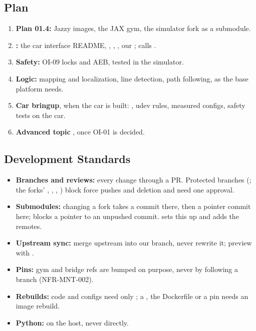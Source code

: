 \documentclass[11pt,a4paper]{article}
\begin{document}
\subsection{Plan}
\begin{enumerate}
  \item \textbf{Plan 01.4:} Jazzy images, the JAX gym, the simulator fork as a submodule.
  \item \textbf{:} the car interface README, , , , our ;  calls .
  \item \textbf{Safety:} OI-09 locks and AEB, tested in the simulator.
  \item \textbf{Logic:} mapping and localization, line detection, path following, as the base platform needs.
  \item \textbf{Car bringup}, when the car is built: , udev rules, measured configs, safety tests on the car.
  \item \textbf{Advanced topic} , once OI-01 is decided.
\end{enumerate}

\subsection{Development Standards}
\begin{itemize}
  \item \textbf{Branches and reviews:} every change through a PR. Protected branches (; the forks' , , , ) block force pushes and deletion and need one approval.
  \item \textbf{Submodules:} changing a fork takes a commit there, then a pointer commit here;  blocks a pointer to an unpushed commit.  sets this up and adds the  remotes.
  \item \textbf{Upstream sync:} merge upstream into our branch, never rewrite it; preview with .
  \item \textbf{Pins:} gym and bridge refs are bumped on purpose, never by following a branch (NFR-MNT-002).
  \item \textbf{Rebuilds:} code and configs need only ; a , the Dockerfile or a pin needs an image rebuild.
  \item \textbf{Python:}  on the host, never  directly.
\end{itemize}
\end{document}
